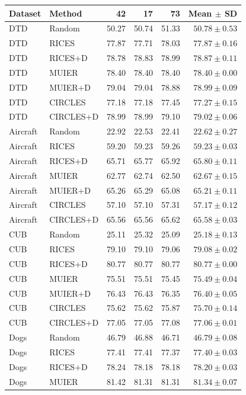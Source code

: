 \begin{tabular}{llrrrr}
\toprule
Dataset & Method & 42 & 17 & 73 & Mean $\pm$ SD \\
\midrule
DTD & Random & 50.27 & 50.74 & 51.33 & $50.78 \pm 0.53$ \\
DTD & RICES & 77.87 & 77.71 & 78.03 & $77.87 \pm 0.16$ \\
DTD & RICES+D & 78.78 & 78.83 & 78.99 & $78.87 \pm 0.11$ \\
DTD & MUIER & 78.40 & 78.40 & 78.40 & $78.40 \pm 0.00$ \\
DTD & MUIER+D & 79.04 & 79.04 & 78.88 & $78.99 \pm 0.09$ \\
DTD & CIRCLES & 77.18 & 77.18 & 77.45 & $77.27 \pm 0.15$ \\
DTD & CIRCLES+D & 78.99 & 78.99 & 79.10 & $79.02 \pm 0.06$ \\
Aircraft & Random & 22.92 & 22.53 & 22.41 & $22.62 \pm 0.27$ \\
Aircraft & RICES & 59.20 & 59.23 & 59.26 & $59.23 \pm 0.03$ \\
Aircraft & RICES+D & 65.71 & 65.77 & 65.92 & $65.80 \pm 0.11$ \\
Aircraft & MUIER & 62.77 & 62.74 & 62.50 & $62.67 \pm 0.15$ \\
Aircraft & MUIER+D & 65.26 & 65.29 & 65.08 & $65.21 \pm 0.11$ \\
Aircraft & CIRCLES & 57.10 & 57.10 & 57.31 & $57.17 \pm 0.12$ \\
Aircraft & CIRCLES+D & 65.56 & 65.56 & 65.62 & $65.58 \pm 0.03$ \\
CUB & Random & 25.11 & 25.32 & 25.09 & $25.18 \pm 0.13$ \\
CUB & RICES & 79.10 & 79.10 & 79.06 & $79.08 \pm 0.02$ \\
CUB & RICES+D & 80.77 & 80.77 & 80.77 & $80.77 \pm 0.00$ \\
CUB & MUIER & 75.51 & 75.51 & 75.45 & $75.49 \pm 0.04$ \\
CUB & MUIER+D & 76.43 & 76.43 & 76.35 & $76.40 \pm 0.05$ \\
CUB & CIRCLES & 75.62 & 75.62 & 75.87 & $75.70 \pm 0.14$ \\
CUB & CIRCLES+D & 77.05 & 77.05 & 77.08 & $77.06 \pm 0.01$ \\
Dogs & Random & 46.79 & 46.88 & 46.71 & $46.79 \pm 0.08$ \\
Dogs & RICES & 77.41 & 77.41 & 77.37 & $77.40 \pm 0.03$ \\
Dogs & RICES+D & 78.24 & 78.18 & 78.18 & $78.20 \pm 0.03$ \\
Dogs & MUIER & 81.42 & 81.31 & 81.31 & $81.34 \pm 0.07$ \\

\end{tabular}
